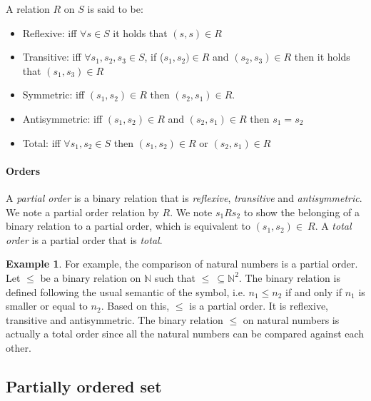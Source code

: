 \documentclass[letterpaper]{article}
\theoremstyle{definition}
\newtheorem{example}{Example}[subsection]
\begin{document}
A relation $R$ on $S$ is said to be:

\begin{itemize}
    \item Reflexive:
    iff $\forall s \in S$ it holds that $(s, s) \in R$
    \item Transitive:
    iff $\forall s_1, s_2, s_3 \in S$,
    if ($s_1, s_2) \in R$ and $(s_2, s_3) \in R$
    then it holds that $(s_1, s_3) \in R$
    \item Symmetric: iff $(s_1, s_2) \in R$ then $(s_2, s_1) \in R$.
    \item Antisymmetric: iff $(s_1, s_2) \in R$
    and $(s_2, s_1) \in R$ then $s_1 = s_2$
    \item Total: iff $\forall s_1, s_2 \in S$ then $(s_1, s_2) \in R$
    or $(s_2, s_1) \in R$

\end{itemize}

\paragraph{Orders}

A \textit{partial order} is a binary relation that is \textit{reflexive},
\textit{transitive} and \textit{antisymmetric}. We note a
partial order relation by $R$.
We note $s_1 R  s_2$ to show the belonging of
a binary relation to a partial order, which is equivalent
to $(s_1, s_2) \in \ R$.
A \textit{total order} is a partial order that is \textit{total}.

\begin{example}

For example, the comparison of natural numbers is a partial order.
Let $\leq$ be a binary relation on $\mathbb{N}$
such that $\leq \ \subseteq \mathbb{N}^2$. The binary relation is defined
following the usual semantic of the symbol, i.e. $n_1 \leq n_2$ if and
only if $n_1$ is smaller or equal to $n_2$.
Based on this, $\leq$ is a partial order. It is
reflexive, transitive and antisymmetric.
The binary relation $\leq$ on natural numbers is actually a total
order since all the natural numbers can be compared against each other.

\end{example}

\subsection{Partially ordered set}

\paragraph{}
\end{document}
